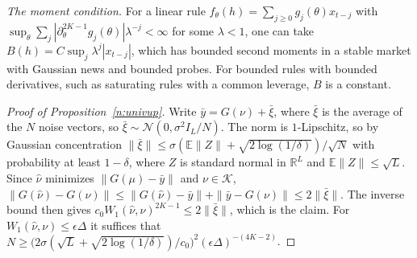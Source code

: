 \noindent\emph{The moment condition.} For a linear rule $f_\theta(h)=\sum_{j\ge0}g_j(\theta)x_{t-j}$ with $\sup_\theta\sum_j|\partial_\theta^{2K-1}g_j(\theta)|\lambda^{-j}<\infty$ for some $\lambda<1$, one can take $B(h)=C\sup_j\lambda^j|x_{t-j}|$, which has bounded second moments in a stable market with Gaussian news and bounded probes. For bounded rules with bounded derivatives, such as saturating rules with a common leverage, $B$ is a constant.

\begin{proof}[Proof of Proposition~\ref{n:univup}]
Write $\bar y=G(\nu)+\bar\xi$, where $\bar\xi$ is the average of the $N$ noise vectors, so $\bar\xi\sim\mathcal N(0,\sigma^2I_L/N)$. The norm is $1$-Lipschitz, so by Gaussian concentration $\|\bar\xi\|\le\sigma(\mathbb E\|Z\|+\sqrt{2\log(1/\delta)})/\sqrt N$ with probability at least $1-\delta$, where $Z$ is standard normal in $\mathbb R^L$ and $\mathbb E\|Z\|\le\sqrt L$. Since $\hat\nu$ minimizes $\|G(\mu)-\bar y\|$ and $\nu\in\mathcal K$, $\|G(\hat\nu)-G(\nu)\|\le\|G(\hat\nu)-\bar y\|+\|\bar y-G(\nu)\|\le2\|\bar\xi\|$. The inverse bound then gives $c_0W_1(\hat\nu,\nu)^{2K-1}\le2\|\bar\xi\|$, which is the claim. For $W_1(\hat\nu,\nu)\le\epsilon\Delta$ it suffices that $N\ge\big(2\sigma(\sqrt L+\sqrt{2\log(1/\delta)})/c_0\big)^2(\epsilon\Delta)^{-(4K-2)}$.
\end{proof}

